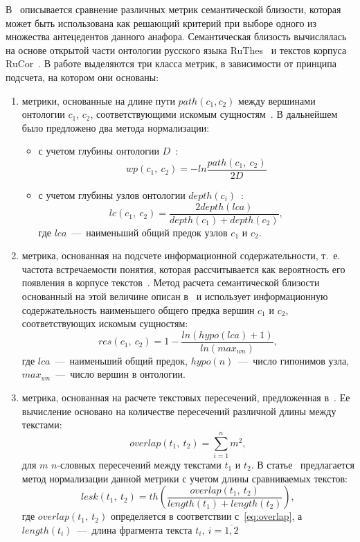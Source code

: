 В~\cite{azerkovich2019ispolzovanie} описывается сравнение различных метрик семантической близости, которая может быть использована как решающий критерий при выборе одного из множества антецедентов данного анафора. Семантическая близость вычислялась на основе  открытой части онтологии русского языка RuThes~\cite{lukashevich2011thesauri} и текстов корпуса RuCor~\cite{toldova2016russian}. В работе выделяются три класса метрик, в зависимости от принципа подсчета, на котором они основаны:
\begin{enumerate}
	\item метрики, основанные на длине пути $path(c_1, c_2)$ между вершинами онтологии $c_1$, $c_2$, соответствующими искомым сущностям~\cite{rada1989development}. В дальнейшем было предложено два метода нормализации:
	\begin{itemize}
		\item с учетом глубины онтологии $D$~\cite{wu1994verb}:
		\begin{equation}
			wp(c_1,\ c_2) = -ln\frac{path(c_1,\ c_2)}{2D}
		\end{equation}
		\item с учетом глубины узлов онтологии $depth(c_i)$~\cite{leacock1998combining}:
		\begin{equation}
			lc(c_1,\ c_2)=\frac{2depth(lca)}{depth(c_1)+depth(c_2)},
		\end{equation}
		где $lca$~---~наименьший общий предок узлов $c_1$ и $c_2$.
	\end{itemize}
	\item метрика, основанная на подсчете информационной содержательности, т.~е. частота встречаемости понятия, которая рассчитывается как вероятность его появления в корпусе текстов~\cite{resnik1995using}. Метод расчета семантической близости основанный на этой величине описан в~\cite{seco2004intrinsic} и использует информационную содержательность наименьшего общего предка вершин $c_1$ и $c_2$, соответствующих искомым сущностям:
	\begin{equation}
		res(c_1,\ c_2) = 1 - \frac{ln(hypo(lca)+1)}{ln(max_{wn})},
	\end{equation}
	где $lca$~---~наименьший общий предок, $hypo(n)$~---~число гипонимов узла, $max_{wn}$~---~число вершин в онтологии.
	\item метрика, основанная на расчете текстовых пересечений, предложенная в~\cite{lesk1986automatic}. Ее вычисление основано на количестве пересечений различной длины между текстами:
	\begin{equation}
		\label{eq:overlap}
		overlap(t_1,\ t_2) = \sum^{n}_{i=1} m^2,
	\end{equation}
	для $m$ $n$-словных пересечений между текстами $t_1$ и $t_2$. В статье~\cite{ponzetto2006exploiting} предлагается метод нормализации данной метрики с учетом длины сравниваемых текстов:
	\begin{equation}
		lesk(t_1,\ t_2)=th(\frac{overlap(t_1,\ t_2)}{length(t_1)+length(t_2)}),
	\end{equation} 
	где $overlap(t_1,\ t_2)$ определяется в соответствии с~\ref{eq:overlap}, а $length(t_i)$~---~длина фрагмента текста $t_i,\ i=\overline{1,2}$
\end{enumerate}

